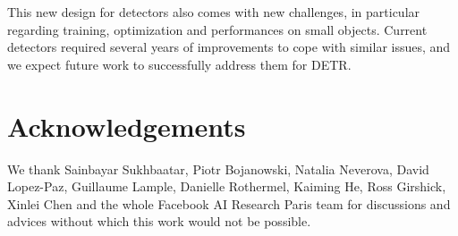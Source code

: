 \documentclass[runningheads]{llncs}
\newcommand{\detr}{DETR\xspace}
\begin{document}
This new design for detectors also comes with new challenges, in particular regarding training, optimization and performances on small objects. Current detectors required several years of improvements to cope with similar issues, and we expect future work to successfully address them for \detr.



\section{Acknowledgements}

We thank Sainbayar Sukhbaatar, Piotr Bojanowski, Natalia Neverova, David Lopez-Paz, Guillaume Lample, Danielle Rothermel, Kaiming He, Ross Girshick, Xinlei Chen and the whole Facebook AI Research Paris team for discussions and advices without which this work would not be possible.




\appendix
\newpage

\end{document}
